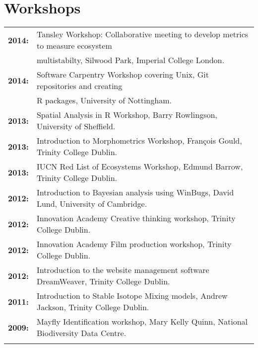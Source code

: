 \documentclass[10pt,a4paper]{article}
\begin{document}
\section{Workshops}

\begin{tabular}{ll}
\textbf{2014:} & Tansley Workshop: Collaborative meeting to develop metrics to measure ecosystem\\
&multistabilty, Silwood Park, Imperial College London.\\
\textbf{2014:} & Software Carpentry Workshop covering Unix, Git repositories and creating\\
&R packages, University of Nottingham.\\
\textbf{2013:} & Spatial Analysis in R Workshop, Barry Rowlingson, University of Sheffield.\\
\textbf{2013:} & Introduction to Morphometrics Workshop, François Gould, Trinity College Dublin.\\
\textbf{2013:} & IUCN Red List of Ecosystems Workshop, Edmund Barrow, Trinity College Dublin.\\
\textbf{2012:} & Introduction to Bayesian analysis using WinBugs, David Lund, University of Cambridge.\\
\textbf{2012:} & Innovation Academy Creative thinking workshop, Trinity College Dublin.\\
\textbf{2012:} & Innovation Academy Film production workshop, Trinity College Dublin.\\
\textbf{2012:} & Introduction to the website management software DreamWeaver, Trinity College Dublin.\\
\textbf{2011:} & Introduction to Stable Isotope Mixing models, Andrew Jackson, Trinity College Dublin.\\
\textbf{2009:} & Mayfly Identification workshop, Mary Kelly Quinn, National Biodiversity Data Centre.\\
&\\
\end{tabular}

\bigskip
\end{document}
